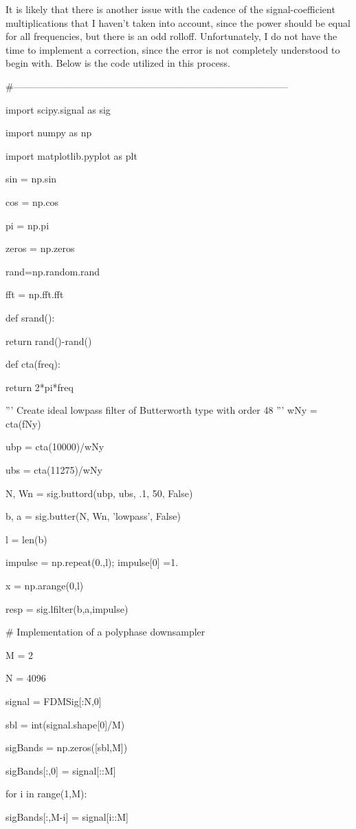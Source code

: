 \documentclass{report}
\begin{document}
It is likely that there is another issue with the cadence of the signal-coefficient multiplications that I haven't taken into account, since the power should be equal for all frequencies, but there is an odd rolloff.  Unfortunately, I do not have the time to implement a correction, since the error is not completely understood to begin with.  Below is the code utilized in this process.

\#--------------------------------------------------------------------------------------

import scipy.signal as sig

import numpy as np

import matplotlib.pyplot as plt

sin = np.sin

cos = np.cos

pi = np.pi

zeros = np.zeros

rand=np.random.rand

fft = np.fft.fft

def srand():

  return rand()-rand()

def cta(freq):

    return 2*pi*freq
    

'''
Create ideal lowpass filter of Butterworth type with order 48
'''
wNy = cta(fNy)

ubp = cta(10000)/wNy

ubs = cta(11275)/wNy

N, Wn = sig.buttord(ubp, ubs, .1, 50, False)

b, a = sig.butter(N, Wn, 'lowpass', False)

l = len(b)

impulse = np.repeat(0.,l); impulse[0] =1.

x = np.arange(0,l)

resp = sig.lfilter(b,a,impulse)

\# Implementation of a polyphase downsampler

M = 2

N = 4096

signal = FDMSig[:N,0]
 
sbl = int(signal.shape[0]/M)

sigBands = np.zeros([sbl,M])

sigBands[:,0] = signal[::M]

for i in range(1,M):

    sigBands[:,M-i] = signal[i::M]
\end{document}
